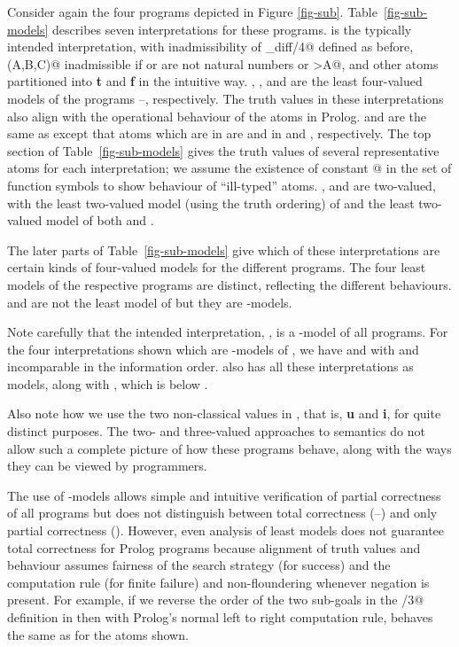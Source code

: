 \documentclass{tlp}
\begin{document}
\vspace{3ex}
\noindent
Consider again the four programs depicted in Figure \ref{fig-sub}.
Table~\ref{fig-sub-models} describes seven interpretations for these
programs.   is the typically intended interpretation, 
with inadmissibility of \verb@eq_diff/4@ defined as before, 
\verb@sub(A,B,C)@ inadmissible
if \verb@A@ or \verb@B@ are not natural numbers or \verb@B>A@, and other
atoms partitioned into \textbf{t} and \textbf{f} in the intuitive way.
, ,  and  are the least four-valued models of the programs
--, respectively.  The truth values in these interpretations also
align with the operational behaviour of the atoms in Prolog.  and
 are the same as  except that atoms which are  in
 are  and  in  and , respectively.
The top section of Table~\ref{fig-sub-models} gives the truth values
of several representative atoms for each interpretation; we assume the
existence of constant \verb@[]@ in the set of function symbols to show
behaviour of ``ill-typed'' atoms.  ,  and  are two-valued,
with  the least two-valued model (using the truth ordering) of 
and  the least two-valued model of both  and .

The later parts of Table~\ref{fig-sub-models} give which of these
interpretations are certain kinds of four-valued models for the different
programs.  The four least models of the respective programs are distinct,
reflecting the different behaviours.   and  are not the least
model of  but they are -models.  

Note carefully that the intended interpretation,
, is a -model of all programs.  
For the four
interpretations shown which are -models of ,
we have  and  with  and  incomparable in the information
order.   also has all these interpretations as models, along with
, which is below .  

Also note how we use the two non-classical values
in , that is, \textbf{u} and \textbf{i}, 
for quite distinct purposes.
The two- and three-valued approaches to semantics do not allow such a
complete picture of how these programs behave, along with the ways they
can be viewed by programmers.

The use of -models
allows simple and intuitive verification of partial correctness of
all programs but does not distinguish between total correctness (--)
and only partial correctness ().  However, even analysis of least
models does not guarantee total correctness for Prolog programs because
alignment of truth values and behaviour assumes fairness of the search
strategy (for success) and the computation rule (for finite failure)
and non-floundering whenever negation is present.  For example, if we
reverse the order of the two sub-goals in the \verb@sub/3@ definition
in  then with Prolog's normal left to right computation rule, 
behaves the same as  for the atoms shown.
\end{document}
